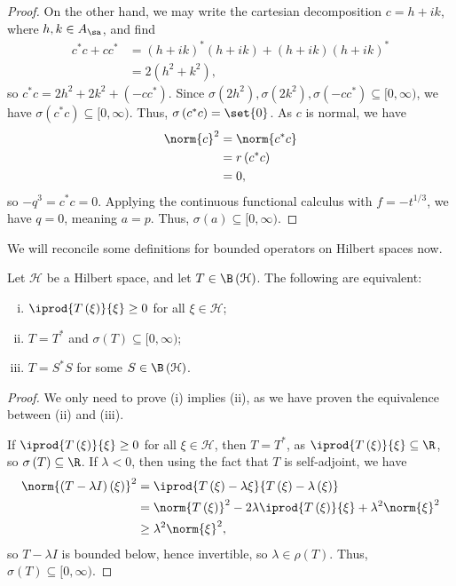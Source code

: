 \documentclass[10pt]{mypackage}
\begin{document}
\begin{proof}
  On the other hand, we may write the cartesian decomposition $c = h + ik$, where $h,k\in A_{\sa}$, and find
  \begin{align*}
    c^{\ast}c + cc^{\ast} &= \left(h + ik\right)^{\ast}\left(h+ik\right) + \left(h+ik\right)\left(h+ik\right)^{\ast}\\
                          &= 2\left(h^2 + k^2\right),
  \end{align*}
  so $c^{\ast}c = 2h^2 + 2k^2 + \left(-cc^{\ast}\right)$. Since $\sigma\left(2h^2\right),\sigma\left(2k^2\right),\sigma\left(-cc^{\ast}\right)\subseteq [0,\infty)$, we have $\sigma\left(c^{\ast}c\right)\subseteq [0,\infty)$. Thus, $\sigma\left(c^{\ast}c\right) = \set{0}$. As $c$ is normal, we have
  \begin{align*}
    \norm{c}^2 &= \norm{c^{\ast}c}\\
               &= r\left(c^{\ast}c\right)\\
               &= 0,
  \end{align*}
  so $-q^3 = c^{\ast}c = 0$. Applying the continuous functional calculus with $f = -t^{1/3}$, we have $q = 0$, meaning $a = p$. Thus, $\sigma\left(a\right)\subseteq [0,\infty)$.
\end{proof}
We will reconcile some definitions for bounded operators on Hilbert spaces now.
\begin{proposition}
  Let $\mathcal{H}$ be a Hilbert space, and let $T\in \B\left(\mathcal{H}\right)$. The following are equivalent:
  \begin{enumerate}[(i)]
    \item $ \iprod{T\left(\xi\right)}{\xi} \geq 0$ for all $\xi\in \mathcal{H}$;
    \item $T = T^{\ast}$ and $\sigma\left(T\right) \subseteq [0,\infty)$;
    \item $T = S^{\ast}S$ for some $S\in \B\left(\mathcal{H}\right)$.
  \end{enumerate}
\end{proposition}
\begin{proof}
  We only need to prove (i) implies (ii), as we have proven the equivalence between (ii) and (iii).\newline

  If $ \iprod{T\left(\xi\right)}{\xi} \geq 0 $ for all $\xi\in \mathcal{H}$, then $T = T^{\ast}$, as $ \iprod{T\left(\xi\right)}{\xi}\subseteq \R $, so $\sigma\left(T\right)\subseteq \R$. If $\lambda < 0$, then using the fact that $T$ is self-adjoint, we have
  \begin{align*}
    \norm{\left(T- \lambda I\right)\left(\xi\right)}^2 &= \iprod{T\left(\xi\right) - \lambda\xi}{T\left(\xi\right) - \lambda\left(\xi\right)}\\
                                                       &= \norm{T\left(\xi\right)}^2 - 2\lambda \iprod{T\left(\xi\right)}{\xi} + \lambda^2\norm{\xi}^2\\
                                                       &\geq \lambda^2\norm{\xi}^2,
  \end{align*}
  so $T - \lambda I$ is bounded below, hence invertible, so $\lambda\in\rho\left(T\right)$. Thus, $\sigma\left(T\right)\subseteq[0,\infty)$.
\end{proof}
\end{document}
